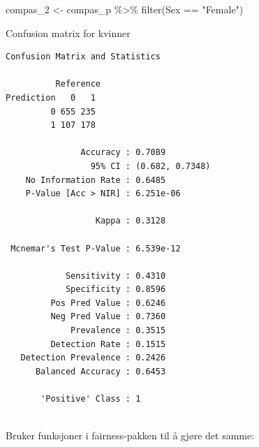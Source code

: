 \documentclass[
  letterpaper,
  DIV=11,
  numbers=noendperiod]{scrreprt}
\newenvironment{Shaded}{\begin{snugshade}}{\end{snugshade}}
\newcommand{\AttributeTok}[1]{\textcolor[rgb]{0.40,0.45,0.13}{#1}}
\newcommand{\FunctionTok}[1]{\textcolor[rgb]{0.28,0.35,0.67}{#1}}
\newcommand{\NormalTok}[1]{\textcolor[rgb]{0.00,0.23,0.31}{#1}}
\newcommand{\OtherTok}[1]{\textcolor[rgb]{0.00,0.23,0.31}{#1}}
\newcommand{\SpecialCharTok}[1]{\textcolor[rgb]{0.37,0.37,0.37}{#1}}
\newcommand{\StringTok}[1]{\textcolor[rgb]{0.13,0.47,0.30}{#1}}
\theoremstyle{definition}
\theoremstyle{remark}
\begin{document}
\begin{Shaded}
\begin{Highlighting}[]
\NormalTok{compas\_2 }\OtherTok{\textless{}{-}}\NormalTok{ compas\_p }\SpecialCharTok{\%\textgreater{}\%} 
  \FunctionTok{filter}\NormalTok{(Sex }\SpecialCharTok{==} \StringTok{"Female"}\NormalTok{)}
\end{Highlighting}
\end{Shaded}

Confusion matrix for kvinner

\begin{Shaded}
\end{Shaded}

\begin{verbatim}
Confusion Matrix and Statistics

          Reference
Prediction   0   1
         0 655 235
         1 107 178
                                         
               Accuracy : 0.7089         
                 95% CI : (0.682, 0.7348)
    No Information Rate : 0.6485         
    P-Value [Acc > NIR] : 6.251e-06      
                                         
                  Kappa : 0.3128         
                                         
 Mcnemar's Test P-Value : 6.539e-12      
                                         
            Sensitivity : 0.4310         
            Specificity : 0.8596         
         Pos Pred Value : 0.6246         
         Neg Pred Value : 0.7360         
             Prevalence : 0.3515         
         Detection Rate : 0.1515         
   Detection Prevalence : 0.2426         
      Balanced Accuracy : 0.6453         
                                         
       'Positive' Class : 1              
                                         
\end{verbatim}

Bruker funksjoner i fairness-pakken til å gjøre det samme:
\end{document}
